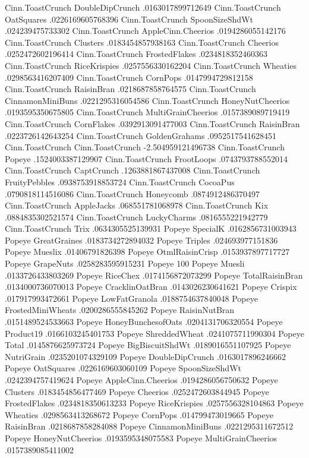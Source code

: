 Cinn.ToastCrunch	DoubleDipCrunch	.0163017899712649
Cinn.ToastCrunch	OatSquares	.0226169605768396
Cinn.ToastCrunch	SpoonSizeShdWt	.024239475733302
Cinn.ToastCrunch	AppleCinn.Cheerios	.0194286055142176
Cinn.ToastCrunch	Clusters	.0183454857938163
Cinn.ToastCrunch	Cheerios	.0252472602196414
Cinn.ToastCrunch	FrostedFlakes	.0234818352460363
Cinn.ToastCrunch	RiceKrispies	.0257556330162204
Cinn.ToastCrunch	Wheaties	.0298563416207409
Cinn.ToastCrunch	CornPops	.0147994729812158
Cinn.ToastCrunch	RaisinBran	.0218687858764575
Cinn.ToastCrunch	CinnamonMiniBuns	.0221295316054586
Cinn.ToastCrunch	HoneyNutCheerios	.0193595350675805
Cinn.ToastCrunch	MultiGrainCheerios	.0157389089719419
Cinn.ToastCrunch	CornFlakes	.0392913091477003
Cinn.ToastCrunch	RaisinBran	.0223726142643254
Cinn.ToastCrunch	GoldenGrahams	.0952517541628451
Cinn.ToastCrunch	Cinn.ToastCrunch	-2.504959121496738
Cinn.ToastCrunch	Popeye	.1524003387129907
Cinn.ToastCrunch	FrootLoops	.0743793788552014
Cinn.ToastCrunch	CaptCrunch	.1263881867437008
Cinn.ToastCrunch	FruityPebbles	.0938753918853724
Cinn.ToastCrunch	CocoaPus	.0790818114516086
Cinn.ToastCrunch	Honeycomb	.0874912486370497
Cinn.ToastCrunch	AppleJacks	.068551781068978
Cinn.ToastCrunch	Kix	.0884835302521574
Cinn.ToastCrunch	LuckyCharms	.0816555221942779
Cinn.ToastCrunch	Trix	.0634305525139931
Popeye	SpecialK	.0162856731003943
Popeye	GreatGraines	.0183734272894032
Popeye	Triples	.024693977151836
Popeye	Mueslix	.01406791826398
Popeye	OtmlRaisinCrisp	.0153937897717727
Popeye	GrapeNuts	.0258283595915231
Popeye	100%
Popeye	Muesli	.0133726433803269
Popeye	RiceChex	.0174156872073299
Popeye	TotalRaisinBran	.0134000736070013
Popeye	CracklinOatBran	.0143026230641621
Popeye	Crispix	.017917993472661
Popeye	LowFatGranola	.0188754637840048
Popeye	FrostedMiniWheats	.0200286555845262
Popeye	RaisinNutBran	.0151489524533663
Popeye	HoneyBunchesofOats	.0204131706320554
Popeye	Product19	.0166103245401753
Popeye	ShreddedWheat	.0241075711990304
Popeye	Total	.0145876625973724
Popeye	BigBiscuitShdWt	.0189016551107925
Popeye	NutriGrain	.0235201074329109
Popeye	DoubleDipCrunch	.0163017896246662
Popeye	OatSquares	.0226169603060109
Popeye	SpoonSizeShdWt	.0242394757419624
Popeye	AppleCinn.Cheerios	.0194286056750632
Popeye	Clusters	.0183454856477469
Popeye	Cheerios	.0252472603844945
Popeye	FrostedFlakes	.0234818350613233
Popeye	RiceKrispies	.0257556328104863
Popeye	Wheaties	.0298563413268672
Popeye	CornPops	.014799473019665
Popeye	RaisinBran	.0218687858284088
Popeye	CinnamonMiniBuns	.0221295311672512
Popeye	HoneyNutCheerios	.0193595348075583
Popeye	MultiGrainCheerios	.0157389085411002

